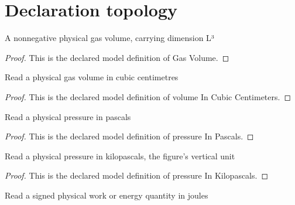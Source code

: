 \section{Declaration topology}
\begin{definition}
  \label{def:physics:phyx-mini-0402:phyxminiproblems-problemphyxmini0402-gasvolume}
  A nonnegative physical gas volume, carrying dimension L³
\end{definition}
\begin{proof}
  This is the declared model definition of Gas Volume.
\end{proof}
\begin{definition}
  \label{def:physics:phyx-mini-0402:phyxminiproblems-problemphyxmini0402-volumeincubiccentimeters}
  Read a physical gas volume in cubic centimetres
\end{definition}
\begin{proof}
  This is the declared model definition of volume In Cubic Centimeters.
\end{proof}
\begin{definition}
  \label{def:physics:phyx-mini-0402:phyxminiproblems-problemphyxmini0402-pressureinpascals}
  Read a physical pressure in pascals
\end{definition}
\begin{proof}
  This is the declared model definition of pressure In Pascals.
\end{proof}
\begin{definition}
  \label{def:physics:phyx-mini-0402:phyxminiproblems-problemphyxmini0402-pressureinkilopascals}
  Read a physical pressure in kilopascals, the figure's vertical unit
\end{definition}
\begin{proof}
  This is the declared model definition of pressure In Kilopascals.
\end{proof}
\begin{definition}
  \label{def:physics:phyx-mini-0402:phyxminiproblems-problemphyxmini0402-energyinjoules}
  Read a signed physical work or energy quantity in joules
\end{definition}
